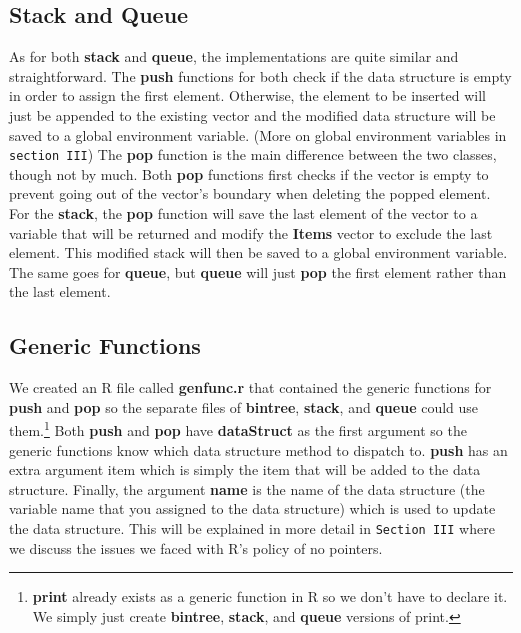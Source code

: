 \documentclass[a4paper, 11pt]{article} %
\begin{document}
\subsection*{Stack and Queue}
\hspace{4ex} As for both \textbf{stack} and \textbf{queue}, the implementations are quite similar and straightforward.  The \textbf{push} functions for both check if the data structure is empty in order to assign the first element. Otherwise, the element to be inserted will just be appended to the existing vector and the modified data structure will be saved to a global environment variable. (More on global environment variables in \texttt{section III}) The \textbf{pop} function is the main difference between the two classes, though not by much. Both \textbf{pop} functions first checks if the vector is empty to prevent going out of the vector's boundary when deleting the popped element. For the \textbf{stack}, the \textbf{pop} function will save the last element of the vector to a variable that will be returned and modify the \textbf{Items} vector to exclude the last element. This modified stack will then be saved to a global environment variable. The same goes for \textbf{queue}, but \textbf{queue} will just \textbf{pop} the first element rather than the last element.

\subsection*{Generic Functions}
\hspace{4ex} We created an R file called \textbf{genfunc.r} that contained the generic functions for \textbf{push} and \textbf{pop} so the separate files of \textbf{bintree}, \textbf{stack}, and \textbf{queue} could use them.\footnote{\textbf{print} already exists as a generic function in R so we don't have to declare it. We simply just create \textbf{bintree}, \textbf{stack}, and \textbf{queue} versions of print.} Both \textbf{push} and \textbf{pop} have \textbf{dataStruct} as the first argument so the generic functions know which data structure method to dispatch to. \textbf{push} has an extra argument item which is simply the item that will be added to the data structure. Finally, the argument \textbf{name} is the name of the data structure (the variable name that you assigned to the data structure) which is used to update the data structure. This will be explained in more detail in \texttt{Section III} where we discuss the issues we faced with R's policy of no pointers.
\end{document}
